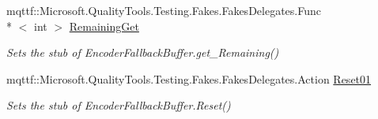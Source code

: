 \begin{DoxyCompactItemize}
mqttf\-::\-Microsoft.\-Quality\-Tools.\-Testing.\-Fakes.\-Fakes\-Delegates.\-Func\\*
$<$ int $>$ \hyperlink{class_system_1_1_text_1_1_fakes_1_1_stub_encoder_fallback_buffer_a151830726334d090faaf1213b01968f4}{Remaining\-Get}
\begin{DoxyCompactList}\small\item\em Sets the stub of Encoder\-Fallback\-Buffer.\-get\-\_\-\-Remaining()\end{DoxyCompactList}\item 
mqttf\-::\-Microsoft.\-Quality\-Tools.\-Testing.\-Fakes.\-Fakes\-Delegates.\-Action \hyperlink{class_system_1_1_text_1_1_fakes_1_1_stub_encoder_fallback_buffer_a0250622a3fcec719373cb2edc4f24772}{Reset01}
\begin{DoxyCompactList}\small\item\em Sets the stub of Encoder\-Fallback\-Buffer.\-Reset()\end{DoxyCompactList}\end{DoxyCompactItemize}
